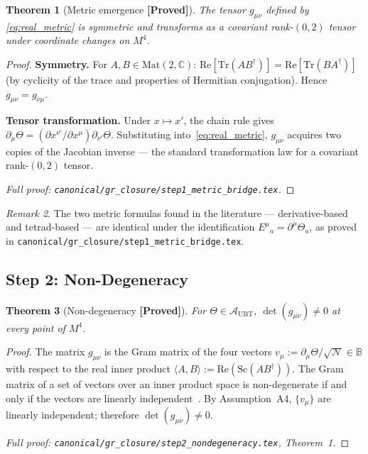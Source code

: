 \documentclass[12pt,a4paper]{article}
\newtheorem{theorem}{Theorem}[section]
\theoremstyle{definition}
\theoremstyle{remark}
\newtheorem{remark}[theorem]{Remark}
\newcommand{\PROVED}{\textbf{[Proved]}}
\newcommand{\B}{\mathbb{B}}
\newcommand{\C}{\mathbb{C}}
\newcommand{\Aubt}{\mathcal{A}_{\mathrm{UBT}}}
\newcommand{\gmn}{g_{\mu\nu}}
\newcommand{\Tr}{\mathrm{Tr}}
\newcommand{\Re}{\mathrm{Re}}
\begin{document}
\begin{theorem}[Metric emergence \PROVED]
\label{thm:metric}
The tensor $\gmn$ defined by \eqref{eq:real_metric} is symmetric and transforms
as a covariant rank-$(0,2)$ tensor under coordinate changes on $M^4$.
\end{theorem}

\begin{proof}
\textbf{Symmetry.}
For $A,B \in \mathrm{Mat}(2,\C)$:
$\Re[\Tr(AB^\dagger)] = \Re[\Tr(BA^\dagger)]$
(by cyclicity of the trace and properties of Hermitian conjugation).
Hence $\gmn = g_{\nu\mu}$.

\textbf{Tensor transformation.}
Under $x \mapsto x'$, the chain rule gives
$\partial_\mu\Theta = (\partial x^{\nu'}/\partial x^\mu)\partial_{\nu'}\Theta$.
Substituting into~\eqref{eq:real_metric}, $\gmn$ acquires two copies of the
Jacobian inverse --- the standard transformation law for a covariant rank-$(0,2)$
tensor.

\noindent\textit{Full proof: \texttt{canonical/gr\_closure/step1\_metric\_bridge.tex}.}
\end{proof}

\begin{remark}
The two metric formulas found in the literature --- derivative-based and tetrad-based
--- are identical under the identification $E^\mu{}_a = \partial^\mu\Theta_a$,
as proved in \texttt{canonical/gr\_closure/step1\_metric\_bridge.tex}.
\end{remark}

\subsection{Step 2: Non-Degeneracy}
\label{sec:step2}

\begin{theorem}[Non-degeneracy \PROVED]
\label{thm:nondeg}
For $\Theta \in \Aubt$, $\det(g_{\mu\nu}) \neq 0$ at every point of $M^4$.
\end{theorem}

\begin{proof}
The matrix $\gmn$ is the Gram matrix of the four vectors
$v_\mu := \partial_\mu\Theta/\sqrt{\mathcal{N}} \in \B$
with respect to the real inner product
$\langle A, B\rangle := \Re(\mathrm{Sc}(AB^\dagger))$.
The Gram matrix of a set of vectors over an inner product space is non-degenerate
if and only if the vectors are linearly independent~\cite{HornJohnson2013}.
By Assumption~A4, $\{v_\mu\}$ are linearly independent; therefore
$\det(g_{\mu\nu}) \neq 0$.

\noindent\textit{Full proof: \texttt{canonical/gr\_closure/step2\_nondegeneracy.tex},
Theorem~1.}
\end{proof}
\end{document}
